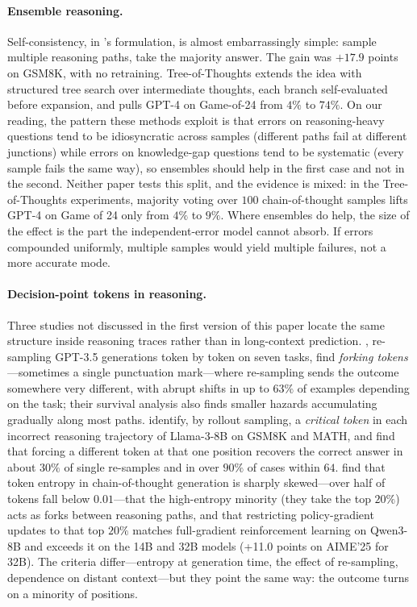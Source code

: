 \paragraph{Ensemble reasoning.}
Self-consistency, in \citet{wang2023self}'s formulation, is almost embarrassingly simple: sample multiple reasoning paths, take the majority answer. The gain was $+17.9$ points on GSM8K, with no retraining. Tree-of-Thoughts \citep{yao2023tree} extends the idea with structured tree search over intermediate thoughts, each branch self-evaluated before expansion, and pulls GPT-4 on Game-of-24 from $4\%$ to $74\%$. On our reading, the pattern these methods exploit is that errors on reasoning-heavy questions tend to be idiosyncratic across samples (different paths fail at different junctions) while errors on knowledge-gap questions tend to be systematic (every sample fails the same way), so ensembles should help in the first case and not in the second. Neither paper tests this split, and the evidence is mixed: in the Tree-of-Thoughts experiments, majority voting over $100$ chain-of-thought samples lifts GPT-4 on Game of 24 only from $4\%$ to $9\%$. Where ensembles do help, the size of the effect is the part the independent-error model cannot absorb. If errors compounded uniformly, multiple samples would yield multiple failures, not a more accurate mode.

\paragraph{Decision-point tokens in reasoning.}
Three studies not discussed in the first version of this paper locate the same structure inside reasoning traces rather than in long-context prediction. \citet{bigelow2025forking}, re-sampling GPT-3.5 generations token by token on seven tasks, find \emph{forking tokens}---sometimes a single punctuation mark---where re-sampling sends the outcome somewhere very different, with abrupt shifts in up to $63\%$ of examples depending on the task; their survival analysis also finds smaller hazards accumulating gradually along most paths. \citet{lin2024critical} identify, by rollout sampling, a \emph{critical token} in each incorrect reasoning trajectory of Llama-3-8B on GSM8K and MATH, and find that forcing a different token at that one position recovers the correct answer in about $30\%$ of single re-samples and in over $90\%$ of cases within $64$. \citet{wang2025beyond8020} find that token entropy in chain-of-thought generation is sharply skewed---over half of tokens fall below $0.01$---that the high-entropy minority (they take the top $20\%$) acts as forks between reasoning paths, and that restricting policy-gradient updates to that top $20\%$ matches full-gradient reinforcement learning on Qwen3-8B and exceeds it on the 14B and 32B models (+11.0 points on AIME'25 for 32B). The criteria differ---entropy at generation time, the effect of re-sampling, dependence on distant context---but they point the same way: the outcome turns on a minority of positions.

